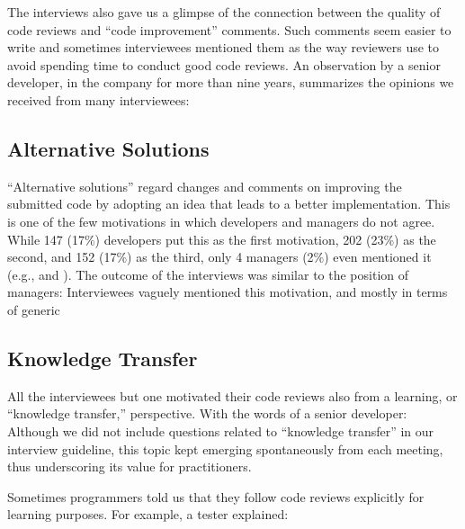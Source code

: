The interviews also gave us a glimpse of the connection between the quality of
code reviews and ``code improvement'' comments. Such comments seem easier to
write and sometimes interviewees mentioned them as the way reviewers use to
avoid spending time to conduct good code reviews. An observation by a senior
developer, in the company for more than nine years, summarizes the opinions we
received from many interviewees: 

\subsection{Alternative Solutions}

``Alternative solutions'' regard changes and comments on improving the
submitted code by adopting an idea that leads to a better implementation. This
is one of the few motivations in which developers and managers do not agree.
While 147 (17\%) developers put this as the first motivation, 202 (23\%) as the
second, and 152 (17\%) as the third, only 4 managers (2\%) even mentioned it
(e.g.,  and
). The outcome of the interviews was similar to the
position of managers: Interviewees vaguely mentioned this motivation, and
mostly in terms of generic 


\subsection{Knowledge Transfer}

All the interviewees but one motivated their code reviews also from a learning,
or ``knowledge transfer,'' perspective. With the words of a senior developer:
 Although we did not
include questions related to ``knowledge transfer'' in our interview guideline,
this topic kept emerging spontaneously from each meeting, thus underscoring its
value for practitioners.

Sometimes programmers told us that they follow code reviews explicitly for
learning purposes. For example, a tester explained: 

